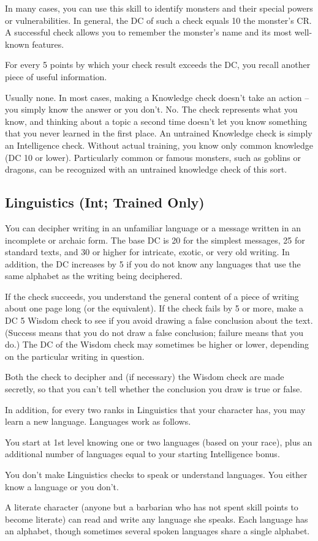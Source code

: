 In many cases, you can use this skill to identify monsters and their special powers or vulnerabilities. In general, the DC of such a check equals 10 \add the monster's CR. A successful check allows you to remember the monster's name and its most well-known features.

For every 5 points by which your check result exceeds the DC, you recall another piece of useful information.

 Usually none. In most cases, making a Knowledge check doesn't take an action -- you simply know the answer or you don't.
 No. The check represents what you know, and thinking about a topic a second time doesn't let you know something that you never learned in the first place.
 An untrained Knowledge check is simply an Intelligence check. Without actual training, you know only common knowledge (DC 10 or lower). Particularly common or famous monsters, such as goblins or dragons, can be recognized with an untrained knowledge check of this sort.

\subsection{Linguistics (Int; Trained Only)}
 You can decipher writing in an unfamiliar language or a message written in an incomplete or archaic form. The base DC is 20 for the simplest messages, 25 for standard texts, and 30 or higher for intricate, exotic, or very old writing. In addition, the DC increases by 5 if you do not know any languages that use the same alphabet as the writing being deciphered.

If the check succeeds, you understand the general content of a piece of writing about one page long (or the equivalent). If the check fails by 5 or more, make a DC 5 Wisdom check to see if you avoid drawing a false conclusion about the text. (Success means that you do not draw a false conclusion; failure means that you do.) The DC of the Wisdom check may sometimes be higher or lower, depending on the particular writing in question.

Both the check to decipher and (if necessary) the Wisdom check are made secretly, so that you can't tell whether the conclusion you draw is true or false.

In addition, for every two ranks in Linguistics that your character has, you may learn a new language. Languages work as follows.
\begin{itemize*}
\item You start at 1st level knowing one or two languages (based on your race), plus an additional number of languages equal to your starting Intelligence bonus.
\item You don't make Linguistics checks to speak or understand languages. You either know a language or you don't.
\item A literate character (anyone but a barbarian who has not spent skill points to become literate) can read and write any language she speaks. Each language has an alphabet, though sometimes several spoken languages share a single alphabet.
\end{itemize*}

